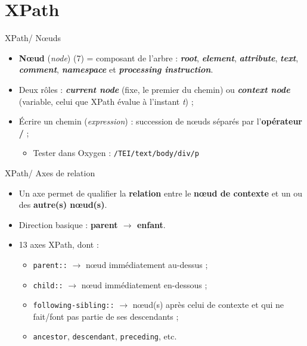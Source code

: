 \documentclass{beamer}
\begin{document}
        \section{XPath}
        
        \begin{frame}{XPath/ N\oe uds}
            \Large
            \begin{itemize}
                \item \textbf{N\oe ud} (\textit{node}) (7) = composant de l'arbre : \textit{\textbf{root}}, \textbf{\textit{element}}, \textbf{\textit{attribute}}, \textbf{\textit{text}}, \textit{\textbf{comment}}, \textit{\textbf{namespace}} et \textit{\textbf{processing instruction}}.
                \bigskip
                \item Deux rôles : \textbf{\textit{current node}} (fixe, le premier du chemin) ou \textbf{\textit{context node}} (variable, celui que XPath évalue à l'instant \textit{t}) ;
                \bigskip
                \item Écrire un chemin (\textit{expression}) : succession de n\oe uds séparés par l'\textbf{opérateur /} ;
                \begin{itemize}
                \Large
                    \item Tester dans Oxygen : \texttt{/TEI/text/body/div/p}
                \end{itemize}
            \end{itemize}
            
        \end{frame}

            \begin{frame}{XPath/ Axes de relation}
            \Large
            \begin{itemize}
                \item Un axe permet de qualifier la \textbf{relation} entre le \textbf{n\oe ud de contexte} et un ou des \textbf{autre(s) n\oe ud(s)}.
                
                \item Direction basique : \textbf{parent $\rightarrow$ enfant}.

                \bigskip

                \item 13 axes XPath, dont :
                \begin{itemize}
                \large
                    \item \texttt{parent::} $\rightarrow$ n\oe ud immédiatement au-dessus ;
                    \item \texttt{child::} $\rightarrow$ n\oe ud immédiatement en-dessous ;
                    \item \texttt{following-sibling::} $\rightarrow$ n\oe ud(s) après celui de contexte et qui ne fait/font pas partie de ses descendants ;
                    \item \texttt{ancestor}, \texttt{descendant}, \texttt{preceding}, etc.
                \end{itemize}
            \end{itemize}
            
        \end{frame}
\end{document}
